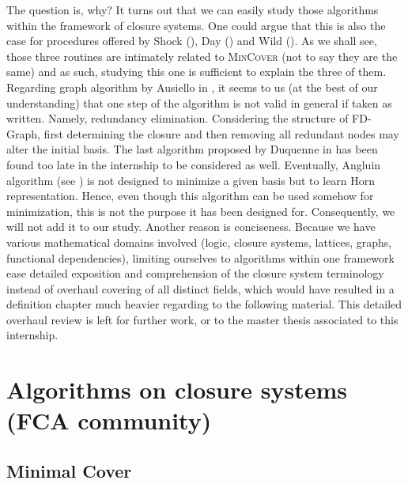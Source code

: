 The question is, why? It turns out that we can easily study those algorithms
within the framework of closure systems. One could argue that this is also the
case for procedures offered by Shock (\cite{shock_computing_1986}),
Day (\cite{day_lattice_1992}) and Wild (\cite{wild_implicational_1989, 
	wild_theory_1994}). As we shall see, those three routines are 
intimately related to \textsc{MinCover} (not to say they are the same) and as 
such, studying this one is sufficient to explain the three of them. Regarding
graph algorithm by Ausiello in \cite{ausiello_graph_1983, 
	ausiello_minimal_1986}, it seems to us (at the best of our understanding) 
	that
one step of the algorithm is not valid in general if taken as written. Namely,
redundancy elimination. Considering the structure of FD-Graph, first 
determining the closure and then removing all redundant nodes may alter 
the initial basis. The last algorithm proposed by Duquenne in 
\cite{duquenne_variations_2007} has been found too late in the internship to
be considered as well. Eventually, Angluin algorithm (see 
\cite{angluin_learning_1992, arias_canonical_2009}) is not designed to minimize 
a given basis but to learn Horn representation. Hence, even though this 
algorithm can be used somehow for minimization, this is not the purpose it has 
been designed for. Consequently, we will not add it to our study.
Another reason is conciseness. Because we have various mathematical domains
involved (logic, closure systems, lattices, graphs, functional dependencies),
limiting ourselves to algorithms within one framework ease detailed exposition
and comprehension of the closure system terminology instead of overhaul covering
of all distinct fields, which would have resulted in a definition chapter much 
heavier regarding to the following material. This detailed overhaul review is
left for further work, or to the master thesis associated to this internship.



\section{Algorithms on closure systems (FCA community)}



\subsection{Minimal Cover}

